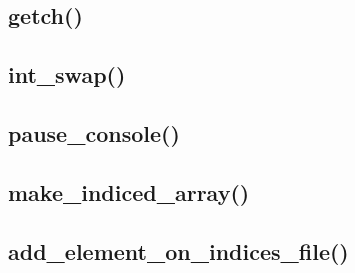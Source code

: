 \documentclass[12pt, a4paper]{article}
\begin{document}
\subsection{getch()}






\subsection{int\_swap()}






\subsection{pause\_console()}






\subsection{make\_indiced\_array()}






\subsection{add\_element\_on\_indices\_file()}


\end{document}
